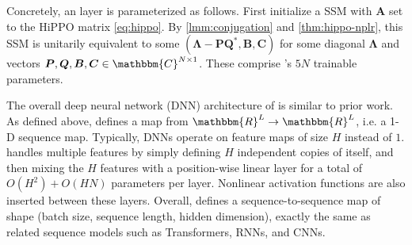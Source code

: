 Concretely, an \methodabbrv{} layer is parameterized as follows.
First initialize a SSM with \( \bm{A} \) set to the HiPPO matrix \eqref{eq:hippo}.
By \cref{lmm:conjugation} and \cref{thm:hippo-nplr},
this SSM is unitarily equivalent to some \( (\bm{\Lambda} - \bm{P}\bm{Q}^*, \bm{B}, \bm{C}) \) for some diagonal \( \bm{\Lambda} \) and vectors \( \bm{P}, \bm{Q}, \bm{B}, \bm{C} \in \mathbbm{C}^{N \times 1} \).
These comprise \methodabbrv's \( 5N \) trainable parameters.


The overall deep neural network (DNN) architecture of \methodabbrv{} is similar to prior work.
As defined above,
\methodabbrv{} defines a map from \( \mathbbm{R}^L \to \mathbbm{R}^L \), i.e. a 1-D sequence map.
Typically, DNNs operate on feature maps of size \( H \) instead of \( 1 \).
\methodabbrv{} handles multiple features by simply defining \( H \) independent copies of itself, and then mixing the \( H \) features with a position-wise linear layer for a total of \( O(H^2) + O(HN) \) parameters per layer.
Nonlinear activation functions are also inserted between these layers.
Overall, \methodabbrv{} defines a sequence-to-sequence map of shape (batch size, sequence length, hidden dimension), exactly the same as related sequence models such as Transformers, RNNs, and CNNs.


